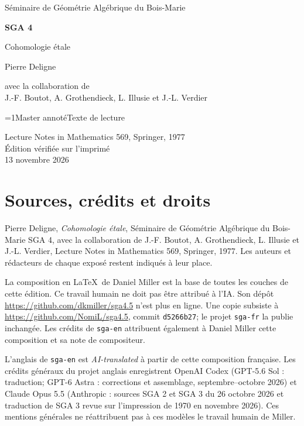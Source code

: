\documentclass[oneside]{book}
\theoremstyle{sga-source}
\theoremstyle{sga-source-dash}
\theoremstyle{sga-source-dotdash}
\theoremstyle{sga-source-number-note-dash}
\theoremstyle{sga-source-note-number-dotdash}
\theoremstyle{sga-source-example-dotdash}
\theoremstyle{sga-source-inline-number}
\theoremstyle{sga-source-bare-number}
\theoremstyle{sga-source}
\providecommand\EditionIsMaster{0}
\begin{document}
\begin{titlepage}
\centering
\vspace*{2cm}
{\Large Séminaire de Géométrie Algébrique du Bois-Marie\par}
\vspace{0.7cm}
{\Huge\bfseries SGA 4\textonehalf\par}
\vspace{0.8cm}
{\huge Cohomologie étale\par}
\vspace{1cm}
{\Large Pierre Deligne\par}
\vspace{0.5cm}
avec la collaboration de\\[0.3em]
J.-F. Boutot, A. Grothendieck, L. Illusie et J.-L. Verdier
\vfill
{\Large \ifnum\EditionIsMaster=1\relax Master annoté\else Texte de lecture\fi\par}
\vspace{0.7cm}
Lecture Notes in Mathematics 569, Springer, 1977\\[0.4em]
Édition vérifiée sur l’imprimé\\
13 novembre 2026
\end{titlepage}

\chapter*{Sources, crédits et droits}
Pierre Deligne, \emph{Cohomologie étale}, Séminaire de Géométrie Algébrique
du Bois-Marie SGA 4\textonehalf, avec la collaboration de J.-F. Boutot,
A. Grothendieck, L. Illusie et J.-L. Verdier, Lecture Notes in Mathematics
569, Springer, 1977. Les auteurs et rédacteurs de chaque exposé restent
indiqués à leur place.

\medskip
La composition en \LaTeX\ de Daniel Miller est la base de toutes les couches
de cette édition. Ce travail humain ne doit pas être attribué à l’IA.
Son dépôt \url{https://github.com/dkmiller/sga4.5} n’est plus en ligne.
Une copie subsiste à \url{https://github.com/NomiL/sga4.5}, commit
\texttt{d5266b27}; le projet \texttt{sga-fr} la publie inchangée.
Les crédits de \texttt{sga-en} attribuent également à Daniel Miller cette
composition et sa note de compositeur.

\medskip
L’anglais de \texttt{sga-en} est \emph{AI-translated} à partir de cette
composition française. Les crédits généraux du projet anglais enregistrent
OpenAI Codex (GPT-5.6 Sol : traduction; GPT-6 Astra : corrections et
assemblage, septembre--octobre 2026) et Claude Opus 5.5 (Anthropic : sources
SGA 2 et SGA 3 du 26 octobre 2026 et traduction de SGA 3 revue sur
l’impression de 1970 en novembre 2026). Ces mentions générales ne
réattribuent pas à ces modèles le travail humain de Miller.
\end{document}
